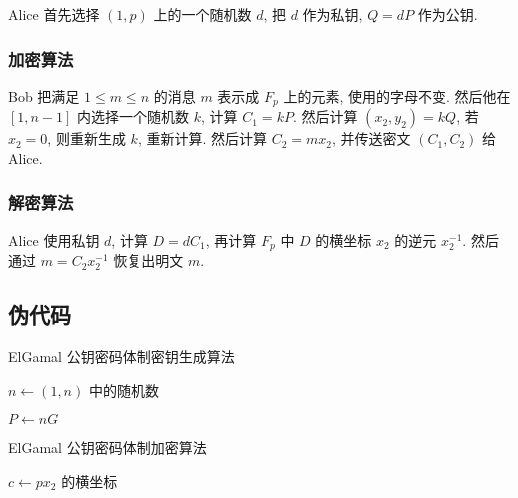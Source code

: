 \documentclass[12pt,a4paper]{article}
\begin{document}
Alice 首先选择 $ (1, p) $ 上的一个随机数 $ d $, 把 $ d $ 作为私钥, $ Q = d P $ 作为公钥. 

\subsubsection*{加密算法}

Bob 把满足 $ 1 \le m \le n $ 的消息 $ m $ 表示成 $ F_p $ 上的元素, 使用的字母不变. 然后他在 $ [1, n - 1] $ 内选择一个随机数 $ k $, 计算 $ C_1 = k P $. 然后计算 $ (x_2, y_2) = k Q $, 若 $ x_2 = 0 $, 则重新生成 $ k $, 重新计算. 然后计算 $ C_2 = m x_2 $, 并传送密文 $ (C_1, C_2) $ 给 Alice.

\subsubsection*{解密算法}

Alice 使用私钥 $ d $, 计算 $ D = d C_1 $, 再计算 $ F_p $ 中 $ D $ 的横坐标 $ x_2 $ 的逆元 $ x_2^{-1} $. 然后通过 $ m = C_2 x_2^{-1} $ 恢复出明文 $ m $. 

\subsection*{伪代码}

\begin{algorithm}[H]
\caption{ElGamal 公钥密码体制密钥生成算法}

$ n \leftarrow (1, n) $ 中的随机数

$ P \leftarrow n G $

\end{algorithm}

\begin{algorithm}[H]
\caption{ElGamal 公钥密码体制加密算法}


$ c \leftarrow p x_2 $ 的横坐标

\end{algorithm}
\end{document}
